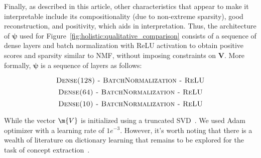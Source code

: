 Finally, as described in this article, other characteristics that appear to make it interpretable include its compositionality (due to non-extreme sparsity), good reconstruction, and positivity, which aids in interpretation. Thus, the architecture of $\bm{\psi}$ used for Figure~\ref{fig:holistic:qualitative_comparison} consists of a sequence of dense layers and batch normalization with ReLU activation to obtain positive scores and sparsity similar to NMF, without imposing constraints on $\mathbf{V}$. More formally, $\bm{\psi}$ is a sequence of layers as follows:

$$
\textsc{Dense(128) - BatchNormalization - ReLU}
$$
$$
\textsc{Dense(64) - BatchNormalization - ReLU}
$$
$$
\textsc{Dense(10) - BatchNormalization - ReLU}
$$

While the vector $\m{V}$ is initialized using a truncated SVD~\cite{fathi2023initialization}. We used Adam optimizer\cite{kingma2014adam} with a learning rate of $1e^{-3}$. However, it's worth noting that there is a wealth of literature on dictionary learning that remains to be explored for the task of concept extraction~\cite{dumitrescu2018dictionary}.








